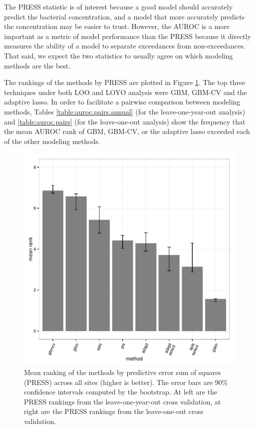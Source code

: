 \documentclass{article}\usepackage[]{graphicx}\usepackage[]{color}
\makeatletter
\newenvironment{kframe}{%
 \def\at@end@of@kframe{}%
 \ifinner\ifhmode%
  \def\at@end@of@kframe{\end{minipage}}%
  \begin{minipage}{\columnwidth}%
 \fi\fi%
 \def\FrameCommand##1{\hskip\@totalleftmargin \hskip-\fboxsep
 \colorbox{shadecolor}{##1}\hskip-\fboxsep
     \hskip-\linewidth \hskip-\@totalleftmargin \hskip\columnwidth}%
 \MakeFramed {\advance\hsize-\width
   \@totalleftmargin\z@ \linewidth\hsize
   \@setminipage}}%
 {\par\unskip\endMakeFramed%
 \at@end@of@kframe}
\newenvironment{knitrout}{}{} %
\numberwithin{equation}{section}
\numberwithin{figure}{section}
\renewcommand\[{\begin{equation}}
\renewcommand\]{\end{equation}}
\makeatother
\begin{document}
The PRESS statistic is of interest because a good model should accurately
predict the bacterial concentration, and a model that more accurately
predicts the concentration may be easier to trust. However, the AUROC
is a more important as a metric of model performance than the PRESS
because it directly measures the ability of a model to separate exceedances
from non-exceedances. That said, we expect the two statistics to usually
agree on which modeling methods are the best.

The rankings of the methods by PRESS are plotted in Figure \ref{fig:press-boxplot}.
The top three techniques under both LOO and LOYO analysis were GBM,
GBM-CV and the adaptive lasso. In order to facilitate a pairwise comparison
between modeling methods, Tables \ref{table:auroc.pairs.annual} (for
the leave-one-year-out analysis) and \ref{table:auroc.pairs} (for
the leave-one-out analysis) show the frequency that the mean AUROC
rank of GBM, GBM-CV, or the adaptive lasso exceeded each of the other
modeling methods.

\begin{knitrout}
\color{fgcolor}\begin{kframe}


{\ttfamily\noindent\bfseries\color{errorcolor}{\#\# Error: error in evaluating the argument 'x' in selecting a method for function 'print': Error: object 'press.barchart' not found}}\end{kframe}\begin{figure}[]

\includegraphics[width=0.49\linewidth]{figure/press-boxplot} \caption[Mean ranking of the methods by predictive error sum of squares (PRESS) across all sites (higher is better)]{Mean ranking of the methods by predictive error sum of squares (PRESS) across all sites (higher is better). The error bars are 90\% confidence intervals computed by the bootstrap. At left are the PRESS rankings from the leave-one-year-out cross validation, at right are the PRESS rankings from the leave-one-out cross validation.\label{fig:press-boxplot}}
\end{figure}


\end{knitrout}
\end{document}
